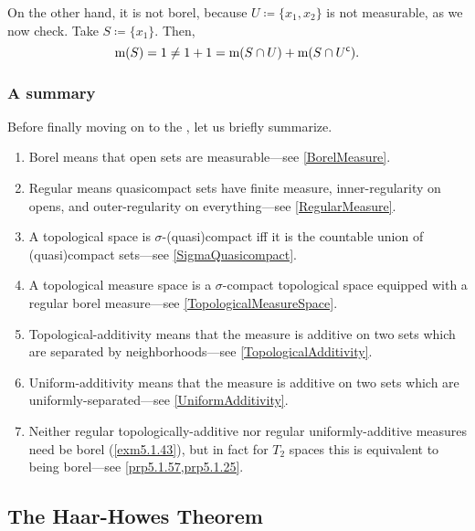 \begin{exm}
On the other hand, it is not borel, because $U\coloneqq \{ x_1,x_2\}$ is not measurable, as we now check.  Take $S\coloneqq \{ x_1\}$.  Then,
\begin{equation}
\mathrm{m} (S)=1\neq 1+1=\mathrm{m} (S\cap U)+\mathrm{m} (S\cap U^{\mathsf{c}}).
\end{equation}
\end{exm}

\subsubsection{A summary}

Before finally moving on to the , let us briefly summarize.
\begin{enumerate}
\item Borel means that open sets are measurable---see \cref{BorelMeasure}.
\item Regular means quasicompact sets have finite measure, inner-regularity on opens, and outer-regularity on everything---see \cref{RegularMeasure}.
\item A topological space is $\sigma$-(quasi)compact iff it is the countable union of (quasi)compact sets---see \cref{SigmaQuasicompact}.
\item A topological measure space is a $\sigma$-compact topological space equipped with a regular borel measure---see \cref{TopologicalMeasureSpace}.
\item Topological-additivity means that the measure is additive on two sets which are separated by neighborhoods---see \cref{TopologicalAdditivity}.
\item Uniform-additivity means that the measure is additive on two sets which are uniformly-separated---see \cref{UniformAdditivity}.
\item Neither regular topologically-additive nor regular uniformly-additive measures need be borel (\cref{exm5.1.43}), but in fact for $T_2$ spaces this is equivalent to being borel---see \cref{prp5.1.57,prp5.1.25}.
\end{enumerate}

\subsection{The Haar-Howes Theorem}

